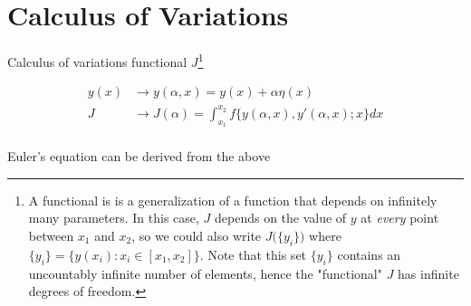 \newpage
\chapter{Calculus of Variations}
\label{app:calcvar}
Calculus of variations functional $J$\footnote{A functional is is a generalization of a function that depends on infinitely many parameters. In this case, $J$ depends on the value of $y$ at \textit{every} point between $x_1$ and $x_2$, so we could also write $J\big(\{y_i\}\big)$ where $\{y_i\}=\{y(x_i):x_i\in[x_1, x_2]\}$. Note that this set $\{y_i\}$ contains an uncountably infinite number of elements, hence the "functional" $J$ has infinite degrees of freedom.}



\begin{equation}
	\begin{split}
		y(x) & \rightarrow y(\alpha, x) = y(x) + \alpha\eta(x) \\
		J & \rightarrow J(\alpha) = \int_{x_1}^{x_2}f\big\{y(\alpha, x), y'(\alpha, x); x\big\}dx \\
	\end{split}
\end{equation}


Euler's equation can be derived from the above







